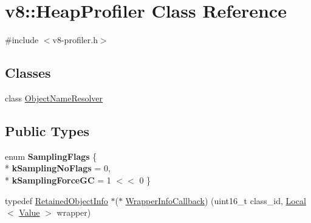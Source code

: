 \hypertarget{classv8_1_1_heap_profiler}{}\section{v8\+:\+:Heap\+Profiler Class Reference}
\label{classv8_1_1_heap_profiler}


{\ttfamily \#include $<$v8-\/profiler.\+h$>$}

\subsection*{Classes}
\begin{DoxyCompactItemize}
\item 
class \hyperlink{classv8_1_1_heap_profiler_1_1_object_name_resolver}{Object\+Name\+Resolver}
\end{DoxyCompactItemize}
\subsection*{Public Types}
\begin{DoxyCompactItemize}
\item 
enum {\bfseries Sampling\+Flags} \{ \\*
{\bfseries k\+Sampling\+No\+Flags} = 0, 
\\*
{\bfseries k\+Sampling\+Force\+GC} = 1 $<$$<$ 0
 \}\hypertarget{classv8_1_1_heap_profiler_aa7826fbe67065080b08309e8f649e049}{}\label{classv8_1_1_heap_profiler_aa7826fbe67065080b08309e8f649e049}

\item 
typedef \hyperlink{classv8_1_1_retained_object_info}{Retained\+Object\+Info} $\ast$($\ast$ \hyperlink{classv8_1_1_heap_profiler_a677025dd201fd832e0464e5ab0b0d0d4}{Wrapper\+Info\+Callback}) (uint16\+\_\+t class\+\_\+id, \hyperlink{classv8_1_1_local}{Local}$<$ \hyperlink{classv8_1_1_value}{Value} $>$ wrapper)
\end{DoxyCompactItemize}
